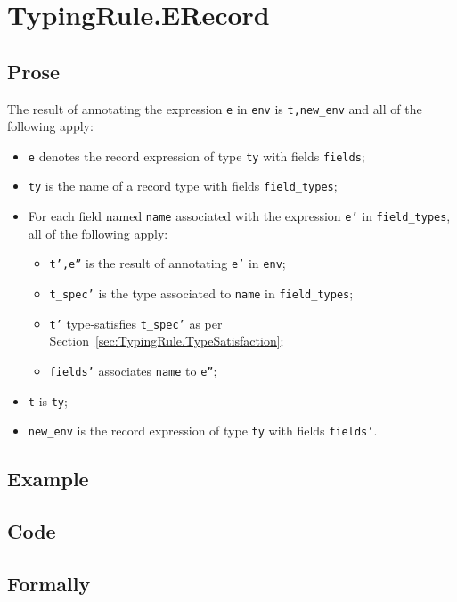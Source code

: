 \documentclass{book}
\begin{document}
\section{TypingRule.ERecord \label{sec:TypingRule.ERecord}}

  \subsection{Prose}
  The result of annotating the expression \texttt{e} in \texttt{env} is
\texttt{t,new\_env} and all of the following apply:
  \begin{itemize}
  \item \texttt{e} denotes the record expression of type \texttt{ty} with fields \texttt{fields};
  \item \texttt{ty} is the name of a record type with fields \texttt{field\_types};
  \item For each field named \texttt{name} associated with the expression \texttt{e'} in
    \texttt{field\_types}, all of the following apply:
    \begin{itemize}
    \item \texttt{t',e''} is the result of annotating \texttt{e'} in \texttt{env};
    \item \texttt{t\_spec'} is the type associated to \texttt{name} in \texttt{field\_types};
    \item \texttt{t'} type-satisfies \texttt{t\_spec'} as per Section~\ref{sec:TypingRule.TypeSatisfaction};
    \item \texttt{fields'} associates \texttt{name} to \texttt{e''};
    \end{itemize}
  \item \texttt{t} is \texttt{ty};
  \item \texttt{new\_env} is the record expression of type \texttt{ty} with fields \texttt{fields'}.
  \end{itemize}

  \subsection{Example}

  \subsection{Code}

\begin{emptyformal}
    \subsection{Formally}
\end{emptyformal}
\end{document}
